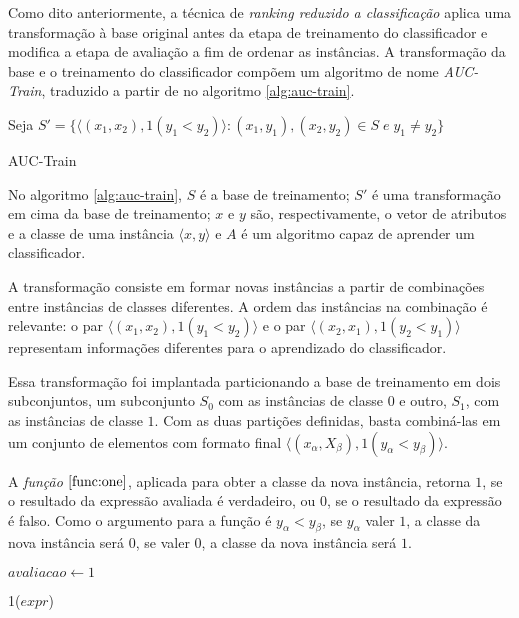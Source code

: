 Como dito anteriormente, a técnica de \emph{ranking reduzido a classificação} aplica uma transformação à base original antes da etapa de treinamento do classificador e modifica a etapa de avaliação a fim de ordenar as instâncias. A transformação da base e o treinamento do classificador compõem um algoritmo de nome \emph{AUC-Train}, traduzido a partir de \cite{langford08} no algoritmo \ref{alg:auc-train}.

\begin{algorithm}[h!]
    Seja $S' = \{\langle (x_1, x_2), 1(y_1 < y_2) \rangle : (x_1, y_1), (x_2, y_2) \in S \; e \;  y_1 \neq y_2\}$\;
    
    \caption{AUC-Train}
    \label{alg:auc-train}
\end{algorithm}

No algoritmo \ref{alg:auc-train}, $S$ é a base de treinamento; $S'$ é uma transformação em cima da base de treinamento; $x$ e $y$ são, respectivamente, o vetor de atributos e a classe de uma instância $\langle x, y \rangle$ e $A$ é um algoritmo capaz de aprender um classificador.

A transformação consiste em formar novas instâncias a partir de combinações entre instâncias de classes diferentes. A ordem das instâncias  na combinação é relevante: o par $\langle (x_1, x_2), 1(y_1 < y_2) \rangle$ e o par $\langle (x_2, x_1), 1(y_2 < y_1) \rangle$ representam informações diferentes para o aprendizado do classificador.

Essa transformação foi implantada particionando a base de treinamento em dois subconjuntos, um subconjunto $S_0$ com as instâncias de classe $0$ e outro, $S_1$, com as instâncias de classe $1$. Com as duas partições definidas, basta combiná-las em um conjunto de elementos com formato final $\langle (x_{\alpha}, X_{\beta}), 1(y_{\alpha} < y_{\beta}) \rangle$.

A \emph{função $\ref{func:one}$}, aplicada para obter a classe da nova instância, retorna $1$, se o resultado da expressão avaliada é verdadeiro, ou $0$, se o resultado da expressão é falso. Como o argumento para a função é $y_{\alpha} < y_{\beta}$, se $y_{\alpha}$ valer $1$, a classe da nova instância será $0$, se valer $0$, a classe da nova instância será $1$.

\begin{function}[h!]
    $avaliacao \gets 1$\;



    \caption{1($expr$)}
    \label{func:one}
\end{function}

